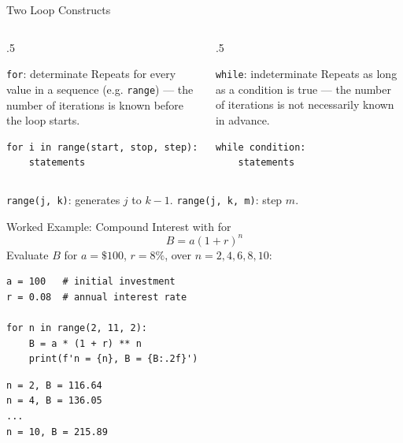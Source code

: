 \documentclass[9pt,aspectratio=169,xcolor=table]{beamer}
\begin{document}
\begin{frame}[fragile]{Two Loop Constructs}
    \leavevmode
    \begin{columns}[t]
        \begin{column}{.5\textwidth}
            \begin{block}{\texttt{for}: determinate}
                \small Repeats for every value in a sequence (e.g.
                \texttt{range}) --- the number of iterations is known
                \alert{before} the loop starts.
\begin{lstlisting}
for i in range(start, stop, step):
    statements
\end{lstlisting}
            \end{block}
        \end{column}
        \begin{column}{.5\textwidth}
            \begin{block}{\texttt{while}: indeterminate}
                \small Repeats as long as a condition is true --- the
                number of iterations is \alert{not} necessarily known
                in advance.
\begin{lstlisting}
while condition:
    statements
\end{lstlisting}
            \end{block}
        \end{column}
    \end{columns}

    \vspace{2mm}
    {\small \texttt{range(j, k)}: generates $j$ to $k-1$.
    \texttt{range(j, k, m)}: step $m$.}
\end{frame}

\begin{frame}[fragile]{Worked Example: Compound Interest with for}
    \leavevmode
    \[
    B = a(1+r)^n
    \]
    Evaluate $B$ for $a=\$100$, $r=8\%$, over $n = 2,4,6,8,10$:

\begin{lstlisting}
a = 100   # initial investment
r = 0.08  # annual interest rate

for n in range(2, 11, 2):
    B = a * (1 + r) ** n
    print(f'n = {n}, B = {B:.2f}')
\end{lstlisting}
\begin{lstlisting}[style=skoutput]
n = 2, B = 116.64
n = 4, B = 136.05
...
n = 10, B = 215.89
\end{lstlisting}
\end{frame}
\end{document}
